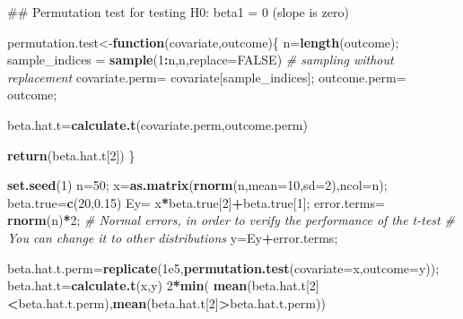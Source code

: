 \documentclass[12pt,]{book}
\newenvironment{Shaded}{\begin{snugshade}}{\end{snugshade}}
\newcommand{\KeywordTok}[1]{\textcolor[rgb]{0.13,0.29,0.53}{\textbf{#1}}}
\newcommand{\DataTypeTok}[1]{\textcolor[rgb]{0.13,0.29,0.53}{#1}}
\newcommand{\DecValTok}[1]{\textcolor[rgb]{0.00,0.00,0.81}{#1}}
\newcommand{\FloatTok}[1]{\textcolor[rgb]{0.00,0.00,0.81}{#1}}
\newcommand{\StringTok}[1]{\textcolor[rgb]{0.31,0.60,0.02}{#1}}
\newcommand{\CommentTok}[1]{\textcolor[rgb]{0.56,0.35,0.01}{\textit{#1}}}
\newcommand{\OtherTok}[1]{\textcolor[rgb]{0.56,0.35,0.01}{#1}}
\newcommand{\ControlFlowTok}[1]{\textcolor[rgb]{0.13,0.29,0.53}{\textbf{#1}}}
\newcommand{\OperatorTok}[1]{\textcolor[rgb]{0.81,0.36,0.00}{\textbf{#1}}}
\newcommand{\NormalTok}[1]{#1}
\begin{document}
\begin{Shaded}
\begin{Highlighting}[]
\NormalTok{## Permutation test for testing H0: beta1 = 0 (slope is zero)}

\NormalTok{permutation.test<-}\ControlFlowTok{function}\NormalTok{(covariate,outcome)\{}
\NormalTok{  n=}\KeywordTok{length}\NormalTok{(outcome);}
\NormalTok{  sample_indices =}\StringTok{ }\KeywordTok{sample}\NormalTok{(}\DecValTok{1}\OperatorTok{:}\NormalTok{n,n,}\DataTypeTok{replace=}\OtherTok{FALSE}\NormalTok{) }\CommentTok{# sampling without replacement}
\NormalTok{  covariate.perm=}\StringTok{ }\NormalTok{covariate[sample_indices]; outcome.perm=}\StringTok{ }\NormalTok{outcome;}

\NormalTok{  beta.hat.t=}\KeywordTok{calculate.t}\NormalTok{(covariate.perm,outcome.perm)}

  \KeywordTok{return}\NormalTok{(beta.hat.t[}\DecValTok{2}\NormalTok{])}
\NormalTok{\}}


\KeywordTok{set.seed}\NormalTok{(}\DecValTok{1}\NormalTok{)}
\NormalTok{n=}\DecValTok{50}\NormalTok{;}
\NormalTok{x=}\KeywordTok{as.matrix}\NormalTok{(}\KeywordTok{rnorm}\NormalTok{(n,}\DataTypeTok{mean=}\DecValTok{10}\NormalTok{,}\DataTypeTok{sd=}\DecValTok{2}\NormalTok{),}\DataTypeTok{ncol=}\NormalTok{n);}
\NormalTok{beta.true=}\KeywordTok{c}\NormalTok{(}\DecValTok{20}\NormalTok{,}\FloatTok{0.15}\NormalTok{)}
\NormalTok{Ey=}\StringTok{ }\NormalTok{x}\OperatorTok{*}\NormalTok{beta.true[}\DecValTok{2}\NormalTok{]}\OperatorTok{+}\NormalTok{beta.true[}\DecValTok{1}\NormalTok{];}
\NormalTok{error.terms=}\StringTok{ }\KeywordTok{rnorm}\NormalTok{(n)}\OperatorTok{*}\DecValTok{2}\NormalTok{; }\CommentTok{# Normal errors, in order to verify the performance of the t-test }
\CommentTok{# You can change it to other distributions }
\NormalTok{y=Ey}\OperatorTok{+}\NormalTok{error.terms;}

\NormalTok{beta.hat.t.perm=}\KeywordTok{replicate}\NormalTok{(}\FloatTok{1e5}\NormalTok{,}\KeywordTok{permutation.test}\NormalTok{(}\DataTypeTok{covariate=}\NormalTok{x,}\DataTypeTok{outcome=}\NormalTok{y));}
\NormalTok{beta.hat.t=}\KeywordTok{calculate.t}\NormalTok{(x,y)}
\DecValTok{2}\OperatorTok{*}\KeywordTok{min}\NormalTok{( }\KeywordTok{mean}\NormalTok{(beta.hat.t[}\DecValTok{2}\NormalTok{]}\OperatorTok{<}\NormalTok{beta.hat.t.perm),}\KeywordTok{mean}\NormalTok{(beta.hat.t[}\DecValTok{2}\NormalTok{]}\OperatorTok{>}\NormalTok{beta.hat.t.perm))}
\end{Highlighting}
\end{Shaded}
\end{document}

